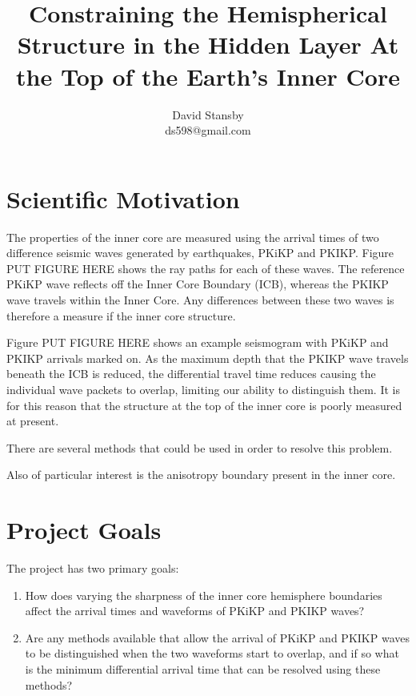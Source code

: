 \documentclass[10pt,a4paper,twocolumn]{article}
\begin{document}
\title{Constraining the Hemispherical Structure in the Hidden Layer At the Top of the Earth's Inner Core}
\author{David Stansby \\ ds598@gmail.com }
\maketitle

\begin{abstract}
\end{abstract}

\section{Scientific Motivation}
The properties of the inner core are measured using the arrival times of two difference seismic waves generated by earthquakes, PKiKP and PKIKP. Figure PUT FIGURE HERE shows the ray paths for each of these waves. The reference PKiKP wave reflects off the Inner Core Boundary (ICB), whereas the PKIKP wave travels within the Inner Core. Any differences between these two waves is therefore a measure if the inner core structure.

Figure PUT FIGURE HERE shows an example seismogram with PKiKP and PKIKP arrivals marked on. As the maximum depth that the PKIKP wave travels beneath the ICB is reduced, the differential travel time reduces causing the individual wave packets to overlap, limiting our ability to distinguish them. It is for this reason that the structure at the top of the inner core is poorly measured at present.

There are several methods that could be used in order to resolve this problem.	

Also of particular interest is the anisotropy boundary present in the inner core.

\section{Project Goals}
The project has two primary goals:
\begin{enumerate}
	\item How does varying the sharpness of the inner core hemisphere boundaries affect the arrival times and waveforms of PKiKP and PKIKP waves?
	\item Are any methods available that allow the arrival of PKiKP and PKIKP waves to be distinguished when the two waveforms start to overlap, and if so what is the minimum differential arrival time that can be resolved using these methods?
\end{enumerate}
\end{document}
